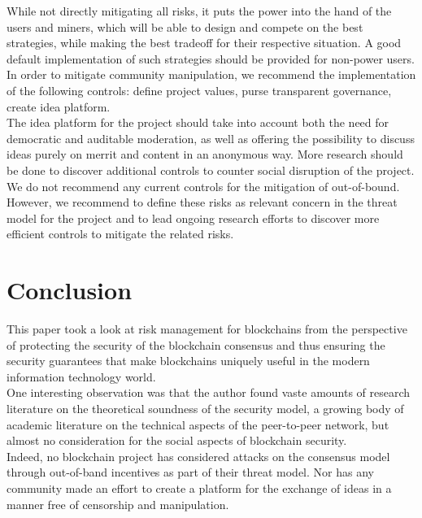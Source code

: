 \documentclass[12pt,a4paper]{article}
\begin{document}
While not directly mitigating all risks, it puts the power into the hand of the users and miners, which will be able to design and compete on the best strategies, while making the best tradeoff for their respective situation. A good default implementation of such strategies should be provided for non-power users.\\

In order to mitigate community manipulation, we recommend the implementation of the following controls: define project values, purse transparent governance, create idea platform.\\

The idea platform for the project should take into account both the need for democratic and auditable moderation, as well as offering the possibility to discuss ideas purely on merrit and content in an anonymous way. More research should be done to discover additional controls to counter social disruption of the project.\\

We do not recommend any current controls for the mitigation of out-of-bound. However, we recommend to define these risks as relevant concern in the threat model for the project and to lead ongoing research efforts to discover more efficient controls to mitigate the related risks.\\

\section{Conclusion}

This paper took a look at risk management for \gls{blockchain}s from the perspective of protecting the security of the blockchain consensus and thus ensuring the security guarantees that make \gls{blockchain}s uniquely useful in the modern information technology world.\\

One interesting observation was that the author found vaste amounts of research literature on the theoretical soundness of the security model, a growing body of academic literature on the technical aspects of the peer-to-peer network, but almost no consideration for the social aspects of blockchain security.\\

Indeed, no blockchain project has considered attacks on the consensus model through out-of-band incentives as part of their threat model. Nor has any community made an effort to create a platform for the exchange of ideas in a manner free of censorship and manipulation.\\
\end{document}
